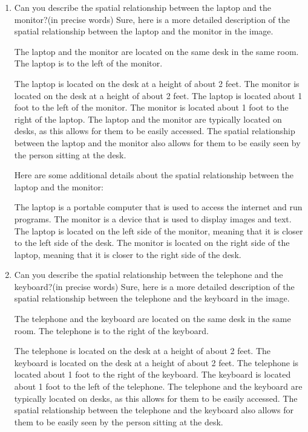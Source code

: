 \begin{enumerate}
    \item Can you describe the spatial relationship between the laptop and the monitor?(in precise words)
    \subitem 
    Sure, here is a more detailed description of the spatial relationship between the laptop and the monitor in the image.
    
    The laptop and the monitor are located on the same desk in the same room. The laptop is to the left of the monitor.
    
    The laptop is located on the desk at a height of about 2 feet.
    The monitor is located on the desk at a height of about 2 feet.
    The laptop is located about 1 foot to the left of the monitor.
    The monitor is located about 1 foot to the right of the laptop.
    The laptop and the monitor are typically located on desks, as this allows for them to be easily accessed. The spatial relationship between the laptop and the monitor also allows for them to be easily seen by the person sitting at the desk.
    
    Here are some additional details about the spatial relationship between the laptop and the monitor:
    
    The laptop is a portable computer that is used to access the internet and run programs.
    The monitor is a device that is used to display images and text.
    The laptop is located on the left side of the monitor, meaning that it is closer to the left side of the desk.
    The monitor is located on the right side of the laptop, meaning that it is closer to the right side of the desk.
    \item Can you describe the spatial relationship between the telephone and the keyboard?(in precise words)
    \subitem Sure, here is a more detailed description of the spatial relationship between the telephone and the keyboard in the image.

    The telephone and the keyboard are located on the same desk in the same room. The telephone is to the right of the keyboard.
    
    The telephone is located on the desk at a height of about 2 feet.
    The keyboard is located on the desk at a height of about 2 feet.
    The telephone is located about 1 foot to the right of the keyboard.
    The keyboard is located about 1 foot to the left of the telephone.
    The telephone and the keyboard are typically located on desks, as this allows for them to be easily accessed. The spatial relationship between the telephone and the keyboard also allows for them to be easily seen by the person sitting at the desk.
    

\end{enumerate}

